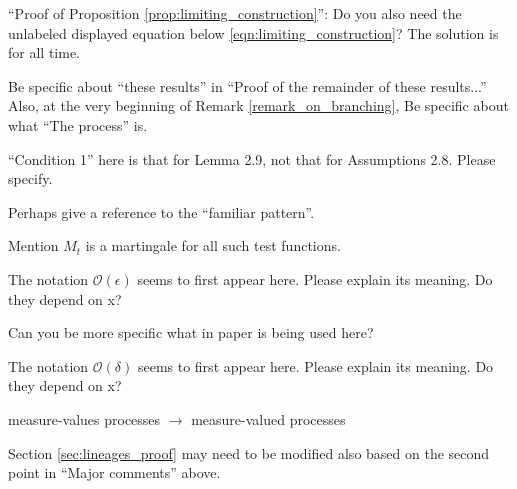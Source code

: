 \reply{
}

\begin{point}{}
``Proof of Proposition \ref{prop:limiting_construction}'': Do you also need the unlabeled displayed equation below
\eqref{eqn:limiting_construction}? The solution is for all time.
\end{point}

\reply{
}

\begin{point}{\revref}
Be specific about ``these results'' in ``Proof of the remainder of these results...'' Also, at the
very beginning of Remark \ref{remark_on_branching}, Be specific about what ``The process'' is.
\end{point}

\reply{
}

\begin{point}{\revref}
``Condition 1'' here is that for Lemma 2.9, not that for Assumptions 2.8. Please specify.
\end{point}

\reply{
}

\begin{point}{\revref}
Perhaps give a reference to the ``familiar pattern''.
\end{point}

\reply{
}

\begin{point}{\revref}
Mention $M_t$ is a martingale for all such test functions.
\end{point}

\reply{
}

\begin{point}{\revref}
    The notation $\mathcal{O}(\epsilon)$ seems to first appear here. Please explain its meaning. Do they
depend on x?
\end{point}

\reply{
}

\begin{point}{\revref}
    Can you be more specific what in paper \citet{barlow/jacka/yor:1986} is being used here?
\end{point}

\reply{
}

\begin{point}{\revref}
The notation $\mathcal{O}(\delta)$ seems to first appear here. Please explain its meaning. Do they
depend on x?
\end{point}

\reply{
}

\begin{point}{\revref}
measure-values processes $\to$ measure-valued processes
\end{point}

\reply{
}

\begin{point}{}
Section \ref{sec:lineages_proof} may need to be modified also based on the second point in ``Major
comments'' above.
\end{point}

\reply{
}

